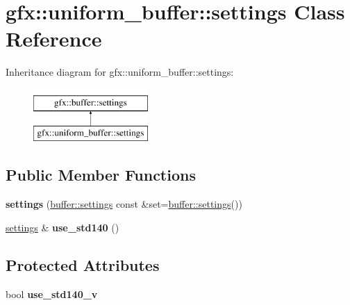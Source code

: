 \hypertarget{classgfx_1_1uniform__buffer_1_1settings}{\section{gfx\-:\-:uniform\-\_\-buffer\-:\-:settings Class Reference}
\label{classgfx_1_1uniform__buffer_1_1settings}
}
Inheritance diagram for gfx\-:\-:uniform\-\_\-buffer\-:\-:settings\-:\begin{figure}[H]
\begin{center}
\leavevmode
\includegraphics[height=2.000000cm]{classgfx_1_1uniform__buffer_1_1settings}
\end{center}
\end{figure}
\subsection*{Public Member Functions}
\begin{DoxyCompactItemize}
\item 
\hypertarget{classgfx_1_1uniform__buffer_1_1settings_a152a596842633c85ff0b55dcceddc1bf}{{\bfseries settings} (\hyperlink{classgfx_1_1buffer_1_1settings}{buffer\-::settings} const \&set=\hyperlink{classgfx_1_1buffer_1_1settings}{buffer\-::settings}())}\label{classgfx_1_1uniform__buffer_1_1settings_a152a596842633c85ff0b55dcceddc1bf}

\item 
\hypertarget{classgfx_1_1uniform__buffer_1_1settings_af115c38107e844ed711208a0fd2c1794}{\hyperlink{classgfx_1_1uniform__buffer_1_1settings}{settings} \& {\bfseries use\-\_\-std140} ()}\label{classgfx_1_1uniform__buffer_1_1settings_af115c38107e844ed711208a0fd2c1794}

\end{DoxyCompactItemize}
\subsection*{Protected Attributes}
\begin{DoxyCompactItemize}
\item 
\hypertarget{classgfx_1_1uniform__buffer_1_1settings_ad5d0dd7e374a069de159b5f584dc63f2}{bool {\bfseries use\-\_\-std140\-\_\-v}}\label{classgfx_1_1uniform__buffer_1_1settings_ad5d0dd7e374a069de159b5f584dc63f2}

\end{DoxyCompactItemize}
